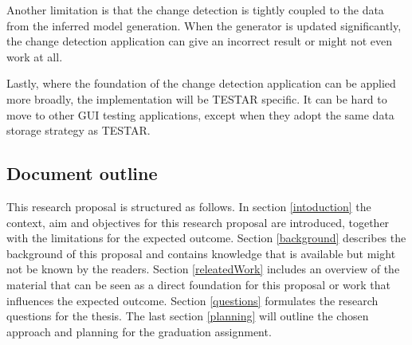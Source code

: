 Another limitation is that the change detection is tightly coupled to the data from the inferred model generation. When the generator is updated significantly, the change detection application can give an incorrect result or might not even work at all. 

Lastly, where the foundation of the change detection application can be applied more broadly, the implementation will be TESTAR specific. It can be hard to move to other GUI testing applications, except when they adopt the same data storage strategy as TESTAR. 

\subsection{Document outline}
This research proposal is structured as follows. In section \ref{intoduction} the context, aim and objectives for this research proposal are introduced, together with the limitations for the expected outcome. Section \ref{background} describes the background of this proposal and contains knowledge that is available but might not be known by the readers. Section \ref{releatedWork} includes an overview of the material that can be seen as a direct foundation for this proposal or work that influences the expected outcome. Section \ref{questions} formulates the research questions for the thesis. The last section \ref{planning} will outline the chosen approach and planning for the graduation assignment.